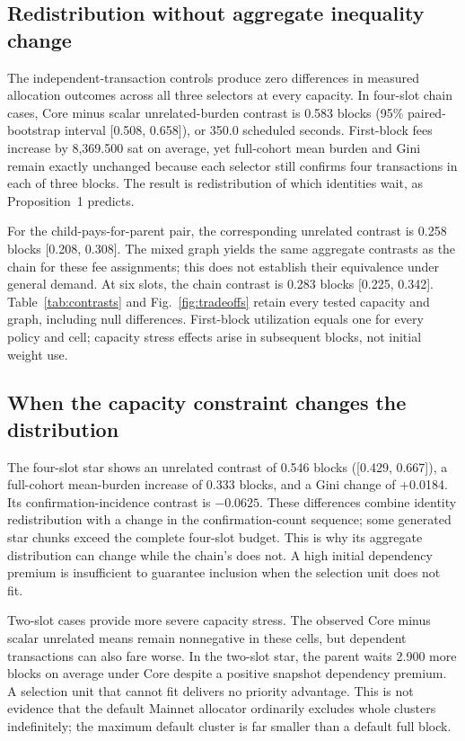 \subsection{Redistribution without aggregate inequality change}
The independent-transaction controls produce zero differences in measured allocation outcomes across all three selectors at every capacity. In four-slot chain cases, Core minus scalar unrelated-burden contrast is 0.583 blocks (95\% paired-bootstrap interval [0.508, 0.658]), or 350.0 scheduled seconds. First-block fees increase by 8,369.500 sat on average, yet full-cohort mean burden and Gini remain exactly unchanged because each selector still confirms four transactions in each of three blocks. The result is redistribution of which identities wait, as Proposition~1 predicts.

For the child-pays-for-parent pair, the corresponding unrelated contrast is 0.258 blocks [0.208, 0.308]. The mixed graph yields the same aggregate contrasts as the chain for these fee assignments; this does not establish their equivalence under general demand. At six slots, the chain contrast is 0.283 blocks [0.225, 0.342]. Table~\ref{tab:contrasts} and Fig.~\ref{fig:tradeoffs} retain every tested capacity and graph, including null differences. First-block utilization equals one for every policy and cell; capacity stress effects arise in subsequent blocks, not initial weight use.

\subsection{When the capacity constraint changes the distribution}
The four-slot star shows an unrelated contrast of 0.546 blocks ([0.429, 0.667]), a full-cohort mean-burden increase of 0.333 blocks, and a Gini change of +0.0184. Its confirmation-incidence contrast is $-0.0625$. These differences combine identity redistribution with a change in the confirmation-count sequence; some generated star chunks exceed the complete four-slot budget. This is why its aggregate distribution can change while the chain's does not. A high initial dependency premium is insufficient to guarantee inclusion when the selection unit does not fit.

Two-slot cases provide more severe capacity stress. The observed Core minus scalar unrelated means remain nonnegative in these cells, but dependent transactions can also fare worse. In the two-slot star, the parent waits 2.900 more blocks on average under Core despite a positive snapshot dependency premium. A selection unit that cannot fit delivers no priority advantage. This is not evidence that the default Mainnet allocator ordinarily excludes whole clusters indefinitely; the maximum default cluster is far smaller than a default full block.


